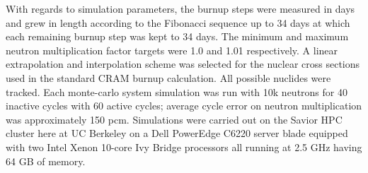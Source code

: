 With regards to simulation parameters, the burnup steps were measured in days
and grew in length according to the Fibonacci sequence up to 34 days at which
each remaining burnup step was kept to 34 days. The minimum and maximum 
neutron multiplication factor targets were 1.0 and 1.01 respectively. A linear
extrapolation and interpolation scheme was selected for the nuclear cross
sections used in the standard CRAM burnup calculation. All possible nuclides
were tracked. Each monte-carlo system simulation was run with 10k neutrons for
40 inactive cycles with 60 active cycles; average cycle error on neutron
multiplication was approximately 150 pcm. Simulations were carried out on the
Savior HPC cluster here at UC Berkeley on a Dell PowerEdge C6220 server blade
equipped with two Intel Xenon 10-core Ivy Bridge processors all running at
2.5 GHz having 64 GB of memory.

